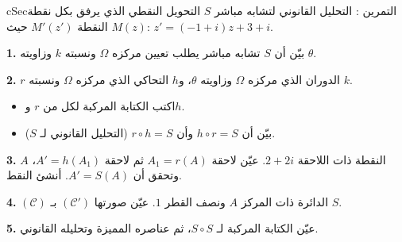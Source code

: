 \documentclass[12pt,a4paper]{article}
\newenvironment{BOX}[2]{\begin{otherlanguage}{english}\begin{arbox}{#1}{#2}}{\end{arbox}\end{otherlanguage}}
\newcounter{exo}
\newenvironment{tamrin}[1]{\stepcounter{exo}\begin{BOX}{cSec}{التمرين \theexo: #1}}{\end{BOX}}
\newenvironment{sq}{\begin{itemize}[leftmargin=2.4em,itemsep=3pt]}{\end{itemize}}
\newcommand{\qa}{\item[(أ)]}\newcommand{\qb}{\item[(ب)]}\newcommand{\qc}{\item[(جـ)]}\newcommand{\qd}{\item[(د)]}\newcommand{\qe}{\item[(هـ)]}
\newcommand{\QQ}[1]{\par\smallskip\textbf{#1.} }
\begin{document}
\begin{tamrin}{التحليل القانوني لتشابه مباشر}
$S$ التحويل النقطي الذي يرفق بكل نقطة $M(z)$ النقطة $M'(z')$ حيث: $z'=(-1+i)z+3+i$.
\QQ{1} بيّن أن $S$ تشابه مباشر يطلب تعيين مركزه $\Omega$ ونسبته $k$ وزاويته $\theta$.
\QQ{2} $r$ الدوران الذي مركزه $\Omega$ وزاويته $\theta$، و$h$ التحاكي الذي مركزه $\Omega$ ونسبته $k$.
\begin{sq}
\qa اكتب الكتابة المركبة لكل من $r$ و$h$.
\qb بيّن أن $h\circ r=S$ وأن $r\circ h=S$ (التحليل القانوني لـ $S$).
\end{sq}
\QQ{3} $A$ النقطة ذات اللاحقة $2+2i$. عيّن لاحقة $A_1=r(A)$ ثم لاحقة $A'=h(A_1)$، وتحقق أن $A'=S(A)$. أنشئ النقط.
\QQ{4} $(\mathcal C)$ الدائرة ذات المركز $A$ ونصف القطر $1$. عيّن صورتها $(\mathcal C')$ بـ $S$.
\QQ{5} عيّن الكتابة المركبة لـ $S\circ S$، ثم عناصره المميزة وتحليله القانوني.
\end{tamrin}
\end{document}
